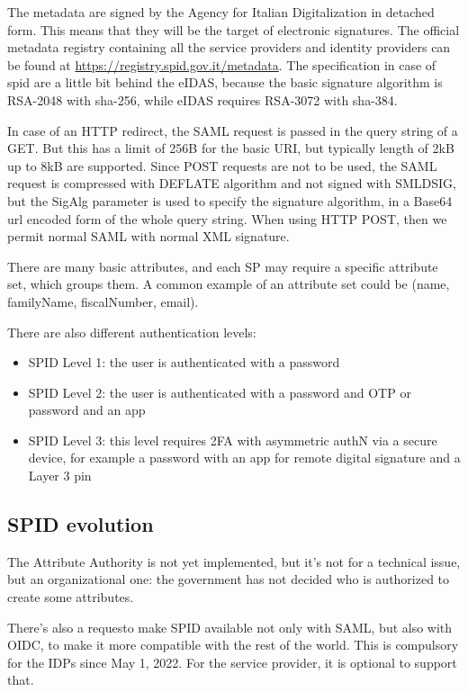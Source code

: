 The metadata are signed by the Agency for Italian Digitalization in
detached form. This means that they will be the target of electronic
signatures. The official metadata registry containing all the service
providers and identity providers can be found at 
\url{https://registry.spid.gov.it/metadata}. The specification in case
of spid are a little bit behind the eIDAS, because the basic signature
algorithm is RSA-2048 with sha-256, while eIDAS requires RSA-3072 
with sha-384.

In case of an HTTP redirect, the SAML request is passed in the query
string of a GET. But this has a limit of 256B for the basic URI, but
typically length of 2kB up to 8kB are supported. Since POST requests
are not to be used, the SAML request is compressed with DEFLATE 
algorithm and not signed with SMLDSIG, but the SigAlg parameter is
used to specify the signature algorithm, in a Base64 url encoded form
of the whole query string. When using HTTP POST, then we permit normal
SAML with normal XML signature.

There are many basic attributes, and each SP may require a specific
attribute set, which groups them. A common example of an attribute set
could be (name, familyName,  fiscalNumber, email).

There are also different authentication levels:
\begin{itemize}
  \item SPID Level 1: the user is authenticated with a password
  \item SPID Level 2: the user is authenticated with a password and OTP
    or password and an app
  \item SPID Level 3: this level requires 2FA with asymmetric authN
    via a secure device, for example a password with an app for remote
    digital signature and a Layer 3 pin
\end{itemize}

\subsection{SPID evolution}
The Attribute Authority is not yet implemented, but it's not for a
technical issue, but an organizational one: the government has not
decided who is authorized to create some attributes.

There's also a requesto make SPID available not only with SAML, but
also with OIDC, to make it more compatible with the rest of the world.
This is compulsory for the IDPs since May 1, 2022. For the service
provider, it is optional to support that.


